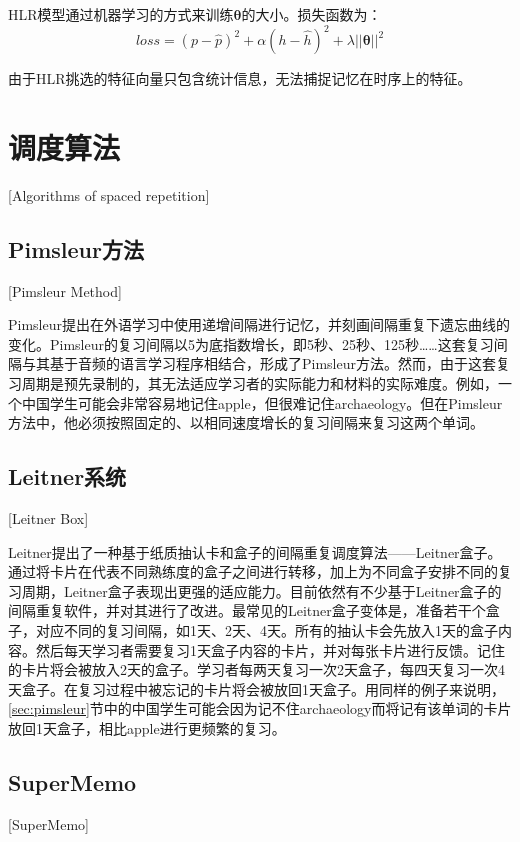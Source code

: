 HLR模型通过机器学习的方式来训练$\boldsymbol \theta$的大小。损失函数为：
\begin{equation}
loss=(p-\hat p)^2 + \alpha(h-\hat h)^2 + \lambda||\boldsymbol\theta||^2
\end{equation}

由于HLR挑选的特征向量只包含统计信息，无法捕捉记忆在时序上的特征。

\section{调度算法}[Algorithms of spaced repetition]

\subsection{Pimsleur方法}[Pimsleur Method]\label{sec:pimsleur}

Pimsleur提出在外语学习中使用递增间隔进行记忆，并刻画间隔重复下遗忘曲线的变化\cite{pimsleurMemorySchedule1967}。Pimsleur的复习间隔以5为底指数增长，即5秒、25秒、125秒……这套复习间隔与其基于音频的语言学习程序相结合，形成了Pimsleur方法。然而，由于这套复习周期是预先录制的，其无法适应学习者的实际能力和材料的实际难度。例如，一个中国学生可能会非常容易地记住apple，但很难记住archaeology。但在Pimsleur方法中，他必须按照固定的、以相同速度增长的复习间隔来复习这两个单词。

\subsection{Leitner系统}[Leitner Box]

Leitner提出了一种基于纸质抽认卡和盒子的间隔重复调度算法——Leitner盒子\cite{leitnerLerntManLeben1974}。通过将卡片在代表不同熟练度的盒子之间进行转移，加上为不同盒子安排不同的复习周期，Leitner盒子表现出更强的适应能力。目前依然有不少基于Leitner盒子的间隔重复软件，并对其进行了改进。最常见的Leitner盒子变体是，准备若干个盒子，对应不同的复习间隔，如1天、2天、4天。所有的抽认卡会先放入1天的盒子内容。然后每天学习者需要复习1天盒子内容的卡片，并对每张卡片进行反馈。记住的卡片将会被放入2天的盒子。学习者每两天复习一次2天盒子，每四天复习一次4天盒子。在复习过程中被忘记的卡片将会被放回1天盒子。用同样的例子来说明，\ref{sec:pimsleur}节中的中国学生可能会因为记不住archaeology而将记有该单词的卡片放回1天盒子，相比apple进行更频繁的复习。

\subsection{SuperMemo}[SuperMemo]


